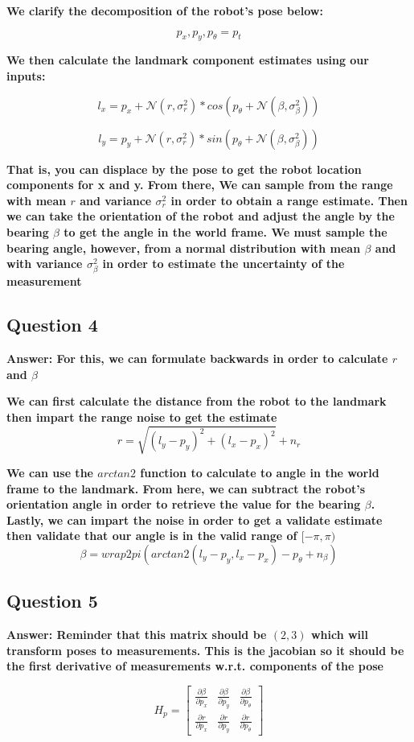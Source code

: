 \documentclass[12pt, a4paper]{article}
\begin{document}
\textbf{We clarify the decomposition of the robot's pose below:}

$$p_x, p_y, p_{\theta} = p_t$$

\textbf{We then calculate the landmark component estimates using our inputs:}

$$l_x = p_x + \mathcal{N}(r, \sigma_{r}^2) * cos(p_{\theta} + \mathcal{N}(\beta, \sigma^2_{\beta})) $$ 

$$l_y = p_y + \mathcal{N}(r, \sigma_{r}^2) * sin(p_{\theta} + \mathcal{N}(\beta, \sigma^2_{\beta}))$$

\textbf{That is, you can displace by the pose to get the robot location components for x and y. From there, We can sample from the range with mean $r$ and variance $\sigma_r^2$ in order to obtain a range estimate. Then we can take the orientation of the robot and adjust the angle by the bearing $\beta$ to get the angle in the world frame. We must sample the bearing angle, however, from a normal distribution with mean $\beta$ and with variance $\sigma^2_{\beta}$ in order to estimate the uncertainty of the measurement}

\subsection{Question 4}
\textbf{Answer: For this, we can formulate backwards in order to calculate $r$ and $\beta$}

\textbf{We can first calculate the distance from the robot to the landmark then impart the range noise to get the estimate}
$$r = \sqrt{(l_y - p_y)^2 + (l_x - p_x)^2} + n_r$$

\textbf{We can use the $arctan2$ function to calculate to angle in the world frame to the landmark. From here, we can subtract the robot's orientation angle in order to retrieve the value for the bearing $\beta$. Lastly, we can impart the noise in order to get a validate estimate then validate that our angle is in the valid range of $[-\pi, \pi)$}
$$\beta = wrap2pi(arctan2(l_y - p_y, l_x - p_x) - p_{\theta} + n_{\beta})$$

\clearpage
\subsection{Question 5}
\textbf{Answer: Reminder that this matrix should be $(2,3)$ which will transform poses to measurements. This is the jacobian so it should be the first derivative of measurements w.r.t. components of the pose}

$$H_p = 
\begin{bmatrix}
    \frac{\partial \beta}{\partial p_x} & \frac{\partial \beta}{\partial p_y} & \frac{\partial \beta}{\partial p_{\theta}} \\
    \frac{\partial r}{\partial p_x} & \frac{\partial r}{\partial p_y} & \frac{\partial r}{\partial p_{\theta}} 
\end{bmatrix}$$
\end{document}
